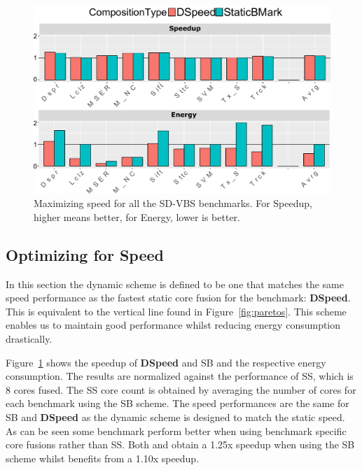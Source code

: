 \begin{figure}
    \centering
	\includegraphics[width=1\textwidth]{cases-paper/graphics/results/speed_bars2.pdf}
    \caption{Maximizing speed for all the SD-VBS benchmarks. For Speedup, higher means better, for Energy, lower is better.}
    \label{fig:speedres}
	\vspace{1em}
\end{figure}

\subsection{Optimizing for Speed} \label{sec:dyn:speed}

In this section the dynamic scheme is defined to be one that matches the same speed performance as the fastest static core fusion for the benchmark: \textbf{DSpeed}.
This is equivalent to the vertical line found in Figure~\ref{fig:paretos}.
This scheme enables us to maintain good performance whilst reducing energy consumption drastically.

Figure~\ref{fig:speedres} shows the speedup of \textbf{DSpeed} and SB and the respective energy consumption.
The results are normalized against the performance of SS, which is 8 cores fused.
The SS core count is obtained by averaging the number of cores for each benchmark using the SB scheme. 
The speed performances are the same for SB and \textbf{DSpeed} as the dynamic scheme is designed to match the static speed.
As can be seen some benchmark perform better when using benchmark specific core fusions rather than SS.
Both  and  obtain a 1.25x speedup when using the SB scheme whilst  benefits from a 1.10x speedup.


